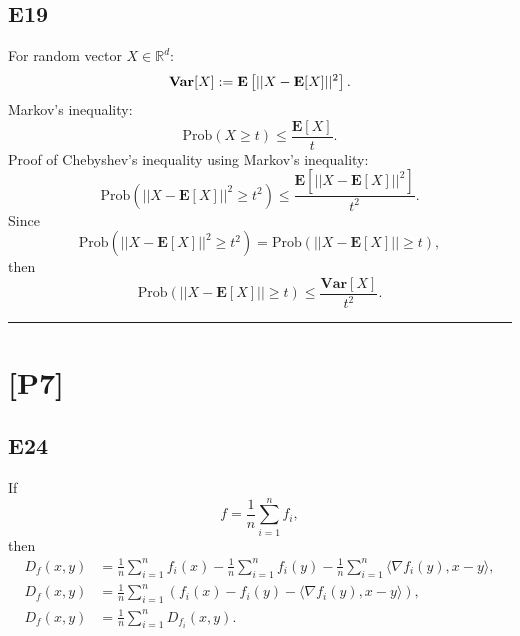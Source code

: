 \documentclass[12pt]{article}
\begin{document}
\subsection*{E19}
For random vector $X \in \mathbb{R}^d$:
\begin{equation}
    \textbf{\text{Var}}[X] := \textbf{E}\left[ ||X - \textbf{E}[X]||^2\right].
    \label{eq:variance}
\end{equation}
Markov's inequality:
\begin{equation}
    \text{Prob}(X \geq t) \leq \frac{\textbf{E}[X]}{t}.
    \label{eq:markovineq}
\end{equation}
Proof of Chebyshev's inequality using Markov's inequality:
\begin{equation*}
    \text{Prob}(||X - \textbf{E}[X]||^2 \geq t^2) \leq \frac{\textbf{E}\left[ ||X - \textbf{E}[X]||^2\right]}{t^2}.
\end{equation*}
Since
\begin{equation}
    \text{Prob}(||X - \textbf{E}[X]||^2 \geq t^2) = \text{Prob}(||X - \textbf{E}[X]|| \geq t),
\end{equation}
then
\begin{equation}
    \text{Prob}(||X - \textbf{E}[X]|| \geq t) \leq \frac{\textbf{Var}[X]}{t^2}.
\end{equation}
\vspace{0.1cm}

\hrule
\vspace{0.1cm}
\section*{[P7]}
\subsection*{E24}
If
\begin{equation*}
    f = \frac{1}{n} \sum^n_{i=1}f_i,
\end{equation*}
then
\begin{equation*}
    \begin{split}
        D_f(x, y) &= \frac{1}{n} \sum^n_{i=1} f_i(x) - 
                \frac{1}{n} \sum^n_{i=1} f_i(y) - 
                \frac{1}{n} \sum^n_{i=1} \langle \nabla f_i(y), x-y \rangle, \\
        D_f(x, y) &= \frac{1}{n} \sum^n_{i=1} (f_i(x) - f_i(y) - \langle \nabla f_i(y), x-y \rangle), \\
        D_f(x, y) &= \frac{1}{n} \sum^n_{i=1} D_{f_i}(x, y).
    \end{split}
\end{equation*}
\end{document}
